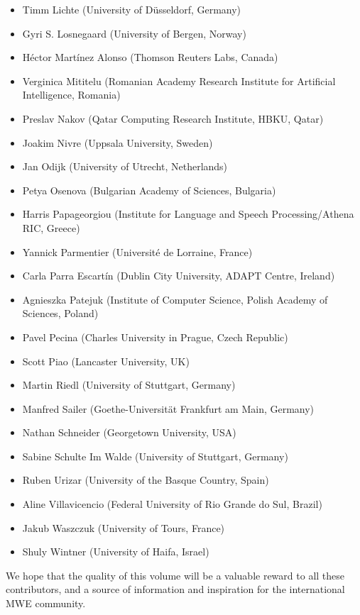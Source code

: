 \documentclass[output=paper,modfonts,]{langscibook}
\begin{document}
\begin{itemize}
\item Timm Lichte (University of Düsseldorf, Germany)
\item Gyri S. Losnegaard (University of Bergen, Norway)
\item Héctor Martínez Alonso (Thomson Reuters Labs, Canada)
\item Verginica Mititelu (Romanian Academy Research Institute for Artificial Intelligence, Romania)
\item Preslav Nakov (Qatar Computing Research Institute, HBKU, Qatar)
\item Joakim Nivre (Uppsala University, Sweden)
\item Jan Odijk (University of Utrecht, Netherlands)
\item Petya Osenova (Bulgarian Academy of Sciences, Bulgaria)
\item Harris Papageorgiou (Institute for Language and Speech Processing/Athena RIC, Greece)
\item Yannick Parmentier (Université de Lorraine, France)
\item Carla Parra Escartín (Dublin City University, ADAPT Centre, Ireland)
\item Agnieszka Patejuk (Institute of Computer Science, Polish Academy of Sciences, Poland)
\item Pavel Pecina (Charles University in Prague, Czech Republic)
\item Scott Piao (Lancaster University, UK)
\item Martin Riedl (University of Stuttgart, Germany)
\item Manfred Sailer (Goethe-Universität Frankfurt am Main, Germany)
\item Nathan Schneider (Georgetown University, USA)
\item Sabine Schulte Im Walde (University of Stuttgart, Germany)
\item Ruben Urizar (University of the Basque Country, Spain)
\item Aline Villavicencio (Federal University of Rio Grande do Sul, Brazil)
\item Jakub Waszczuk (University of Tours, France)
\item Shuly Wintner (University of Haifa, Israel)
\end{itemize}

We hope that the quality of this volume will be a valuable reward to all these contributors, and a source of information and inspiration for the international MWE community.
\end{document}
